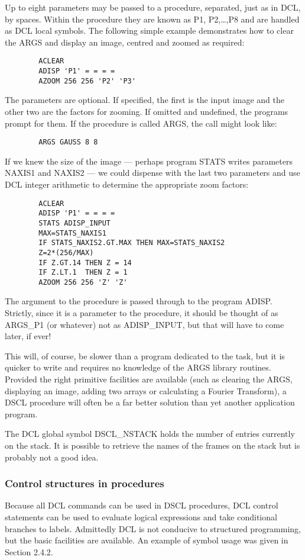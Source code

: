 Up to eight parameters may be passed to a procedure, separated, just as in DCL,
by spaces.
Within the procedure they are known as P1, P2,\ldots,P8 and are handled as DCL
local symbols.
The following simple example demonstrates how to clear the ARGS and display an
image, centred and zoomed as required:
\begin{verbatim}
        ACLEAR
        ADISP 'P1' = = = =
        AZOOM 256 256 'P2' 'P3'
\end{verbatim}
The parameters are optional.
If specified, the first is the input image and the other two are the factors for
zooming.
If omitted and undefined, the programs prompt for them.
If the procedure is called ARGS, the call might look like:
\begin{verbatim}
        ARGS GAUSS 8 8
\end{verbatim}
If we knew the size of the image --- perhaps program STATS writes parameters
NAXIS1 and NAXIS2 --- we could dispense with the last two parameters and use DCL
integer arithmetic to determine the appropriate zoom factors:
\begin{verbatim}
        ACLEAR
        ADISP 'P1' = = = =
        STATS ADISP_INPUT
        MAX=STATS_NAXIS1
        IF STATS_NAXIS2.GT.MAX THEN MAX=STATS_NAXIS2
        Z=2*(256/MAX)
        IF Z.GT.14 THEN Z = 14
        IF Z.LT.1  THEN Z = 1
        AZOOM 256 256 'Z' 'Z'
\end{verbatim}
The argument to the procedure is passed through to the program ADISP.
Strictly, since it is a parameter to the procedure, it should be thought of as
ARGS\_P1 (or whatever) not as ADISP\_INPUT, but that will have to come later, if
ever!

This will, of course, be slower than a program dedicated to the task, but it is
quicker to write and requires no knowledge of the ARGS library routines.
Provided the right primitive facilities are  available (such as clearing the
ARGS, displaying an image, adding two arrays or calculating a Fourier
Transform), a  DSCL  procedure will often be a far better solution than yet
another application program.

The DCL global symbol DSCL\_NSTACK holds the number of entries currently on the
stack.
It is possible to retrieve the names of the frames on the stack but is probably
not a good idea.
\subsubsection {Control structures in procedures}
Because all DCL commands can be used in DSCL procedures, DCL control statements
can be used to evaluate logical expressions and take conditional branches to
labels.
Admittedly DCL is not conducive to structured programming, but the basic
facilities are available.
An example of symbol usage was given in Section 2.4.2.

